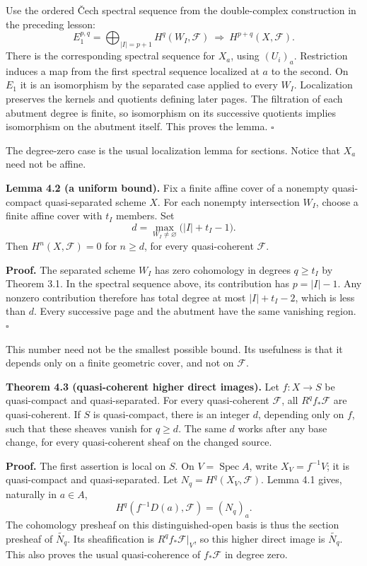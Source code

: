 \documentclass[11pt]{article}
\begin{document}
Use the ordered Čech spectral sequence from the double-complex
construction in the preceding lesson: \[
E_1^{p,q}=\bigoplus_{|I|=p+1}H^q(W_I,\mathcal F)
\ \Longrightarrow\ H^{p+q}(X,\mathcal F).
\] There is the corresponding spectral sequence for \(X_a\), using
\((U_i)_a\). Restriction induces a map from the first spectral sequence
localized at \(a\) to the second. On \(E_1\) it is an isomorphism by the
separated case applied to every \(W_I\). Localization preserves the
kernels and quotients defining later pages. The filtration of each
abutment degree is finite, so isomorphism on its successive quotients
implies isomorphism on the abutment itself. This proves the lemma.
\(\square\)

The degree-zero case is the usual localization lemma for sections.
Notice that \(X_a\) need not be affine.

\textbf{Lemma 4.2 (a uniform bound).} Fix a finite affine cover of a
nonempty quasi-compact quasi-separated scheme \(X\). For each nonempty
intersection \(W_I\), choose a finite affine cover with \(t_I\) members.
Set \[
d=\max_{W_I\ne\varnothing}\bigl(|I|+t_I-1\bigr).
\] Then \(H^n(X,\mathcal F)=0\) for \(n\ge d\), for every quasi-coherent
\(\mathcal F\).

\textbf{Proof.} The separated scheme \(W_I\) has zero cohomology in
degrees \(q\ge t_I\) by Theorem 3.1. In the spectral sequence above, its
contribution has \(p=|I|-1\). Any nonzero contribution therefore has
total degree at most \(|I|+t_I-2\), which is less than \(d\). Every
successive page and the abutment have the same vanishing region.
\(\square\)

This number need not be the smallest possible bound. Its usefulness is
that it depends only on a finite geometric cover, and not on
\(\mathcal F\).

\textbf{Theorem 4.3 (quasi-coherent higher direct images).} Let
\(f:X\to S\) be quasi-compact and quasi-separated. For every
quasi-coherent \(\mathcal F\), all \(R^qf_*\mathcal F\) are
quasi-coherent. If \(S\) is quasi-compact, there is an integer \(d\),
depending only on \(f\), such that these sheaves vanish for \(q\ge d\).
The same \(d\) works after any base change, for every quasi-coherent
sheaf on the changed source.

\textbf{Proof.} The first assertion is local on \(S\). On
\(V=\operatorname{Spec}A\), write \(X_V=f^{-1}V\); it is quasi-compact
and quasi-separated. Let \(N_q=H^q(X_V,\mathcal F)\). Lemma 4.1 gives,
naturally in \(a\in A\), \[
H^q(f^{-1}D(a),\mathcal F)=(N_q)_a.
\] The cohomology presheaf on this distinguished-open basis is thus the
section presheaf of \(\widetilde {N_q}\). Its sheafification is
\(R^qf_*\mathcal F|_V\), so this higher direct image is
\(\widetilde {N_q}\). This also proves the usual quasi-coherence of
\(f_*\mathcal F\) in degree zero.
\end{document}
